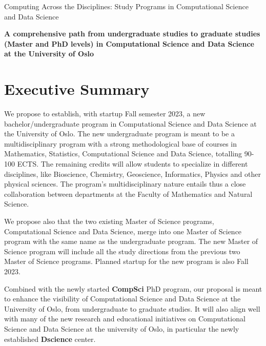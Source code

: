 \documentclass[oneside,final,10pt]{article}
\begin{document}
\thispagestyle{empty}

\begin{center}
{\LARGE\bf
\begin{spacing}{1.25}
Computing Across the Disciplines: Study Programs in Computational Science and Data Science
\end{spacing}
}
\end{center}

\begin{center}
{\bf A comprehensive path from undergraduate studies to graduate studies (Master and PhD levels) in Computational Science and Data Science at the University of Oslo }\\ [0mm]
\end{center}


\vspace{1cm}


\section*{Executive Summary}

We propose to establish, with startup Fall semester 2023, a new bachelor/undergraduate program in Computational Science and Data Science at the University of Oslo. 
The new undergraduate program is meant to be a multidisciplinary program with  a strong methodological base of courses in Mathematics, Statistics, Computational Science and Data Science, totalling 90-100 ECTS. The remaining credits will allow students to specialize in different disciplines, like Bioscience, Chemistry, Geoscience, Informatics, Physics and other physical sciences. The program's multidisciplinary nature entails thus a close collaboration between departments at the Faculty of Mathematics and Natural Science.  

We propose also that the two existing Master of Science programs, Computational Science and Data Science, merge into one Master of Science program with the same name as the undergraduate program. The new Master of Science program will include all the study directions from the previous two Master of Science programs. Planned startup for the new program is also Fall 2023. 

Combined with the newly started {\bf CompSci} PhD program, our proposal is meant to enhance the visibility of Computational Science and Data Science at the University of Oslo, from undergraduate to graduate studies. It will also align well with many of the new research and educational initiatives on Computational Science and Data Science at the university of Oslo, in particular the newly established {\bf Dscience} center.
\end{document}

